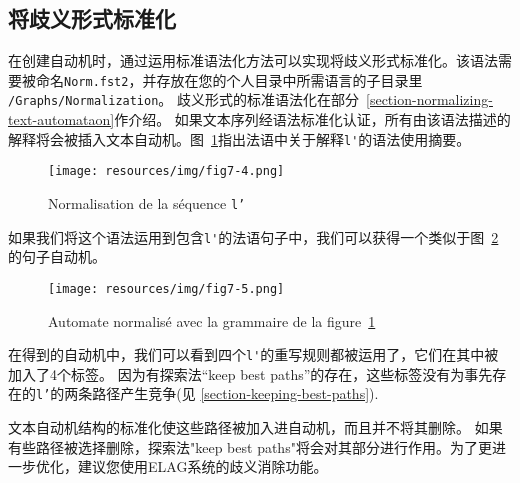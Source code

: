 \subsection{将歧义形式标准化}
在创建自动机时，通过运用标准语法化方法可以实现将歧义形式标准化。该语法需要被命名\verb+Norm.fst2+，并存放在您的个人目录中所需语言的子目录里 \verb+/Graphs/Normalization+。 歧义形式的标准语法化在部分~\ref{section-normalizing-text-automataon}作介绍。
\bigskip
\noindent 如果文本序列经语法标准化认证，所有由该语法描述的解释将会被插入文本自动机。图~\ref{fig-example-tfst-normalization-graph}指出法语中关于解释\verb+l'+的语法使用摘要。 

\begin{figure}[!ht]
\begin{center}
\texttt{[image: resources/img/fig7-4.png]}
\caption{Normalisation de la séquence \texttt{l'}\label{fig-example-tfst-normalization-graph}}
\end{center}
\end{figure}

\bigskip
\noindent 如果我们将这个语法运用到包含\verb+l'+的法语句子中，我们可以获得一个类似于图~\ref{fig-tfst-normalization-results}的句子自动机。
\begin{figure}[!ht]
\begin{center}
\texttt{[image: resources/img/fig7-5.png]}
\caption{Automate normalisé avec la grammaire de la figure~\ref{fig-example-tfst-normalization-graph}
\label{fig-tfst-normalization-results}}
\end{center}
\end{figure}

\bigskip
\noindent 在得到的自动机中，我们可以看到四个\verb+l'+的重写规则都被运用了，它们在其中被加入了4个标签。
因为有探索法“keep best paths”的存在，这些标签没有为事先存在的\verb+l’+的两条路径产生竞争(见 \ref{section-keeping-best-paths}).

文本自动机结构的标准化使这些路径被加入进自动机，而且并不将其删除。
如果有些路径被选择删除，探索法"keep best paths"将会对其部分进行作用。为了更进一步优化，建议您使用ELAG系统的歧义消除功能。


